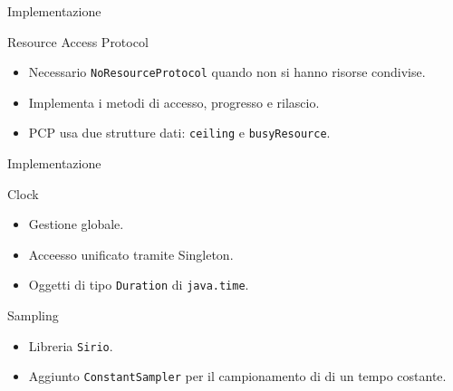 \begin{frame}{Implementazione}
    \begin{block}{Resource Access Protocol}
        \begin{itemize}
            \item Necessario \texttt{NoResourceProtocol} quando non si hanno risorse condivise.
            \item Implementa i metodi di accesso, progresso e rilascio.
            \item PCP usa due strutture dati: \texttt{ceiling} e \texttt{busyResource}.
        \end{itemize}
    \end{block}
\end{frame}

\begin{frame}{Implementazione}
    \begin{block}{Clock}
        \begin{itemize}
            \item Gestione globale.
            \item Acceesso unificato tramite Singleton.
            \item Oggetti di tipo \texttt{Duration} di \texttt{java.time}.
        \end{itemize}
    \end{block}
    \begin{block}{Sampling}
        \begin{itemize}
            \item Libreria \texttt{Sirio}.
            \item Aggiunto \texttt{ConstantSampler} per il campionamento di di un tempo costante.
        \end{itemize}
    \end{block}
\end{frame}